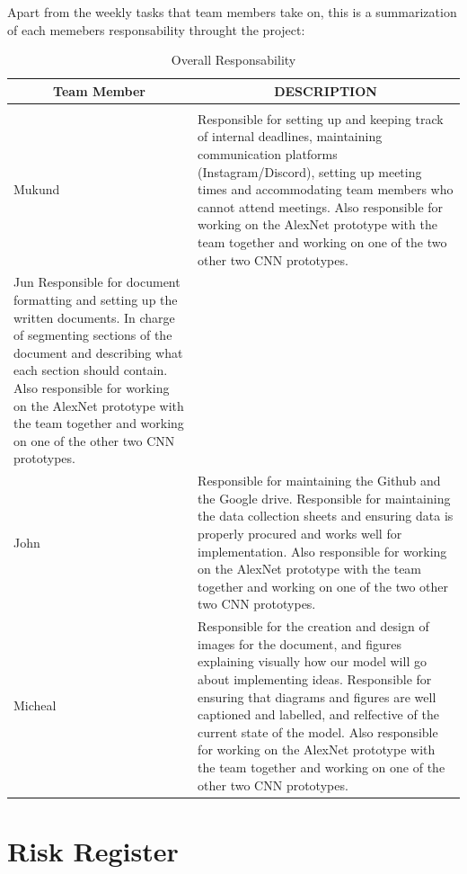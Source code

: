 \documentclass{article} %
\begin{document}
Apart from the weekly tasks that team members take on, this is a summarization of each memebers responsability throught the project:
\begin{table}[t]
\caption{Overall Responsability}
\label{sample-table}
\begin{center}
\begin{tabular}{ll}
\multicolumn{1}{c}{\bf Team Member}  &\multicolumn{1}{c}{\bf DESCRIPTION}
\\ \hline \\
Mukund           &Responsible for setting up and keeping track of internal deadlines, maintaining communication platforms (Instagram/Discord), setting up meeting times and accommodating team members who cannot attend meetings. Also responsible for working on the AlexNet prototype with the team together and working on one of the two other two CNN prototypes.\\
                 
Jun              Responsible for document formatting and setting up the written documents. In charge of segmenting sections of the document and describing what each section should contain. Also responsible for working on the AlexNet prototype with the team together and working on one of the other two CNN prototypes. \\

John             &Responsible for maintaining the Github and the Google drive. Responsible for maintaining the data collection sheets and ensuring data is properly  procured and works well for implementation. Also responsible for working on the AlexNet prototype with the team together and working on one of the two other two CNN prototypes.\\

Micheal          &Responsible for the creation and design of images for the document, and figures explaining visually how our model will go about implementing ideas.   Responsible for ensuring that diagrams and figures are well captioned and labelled, and relfective of the current state of the model. Also responsible for working on the AlexNet prototype with the team together and working on one of the other two CNN prototypes. \\

\end{tabular}
\end{center}
\end{table}

\section {Risk Register}
\end{document}
